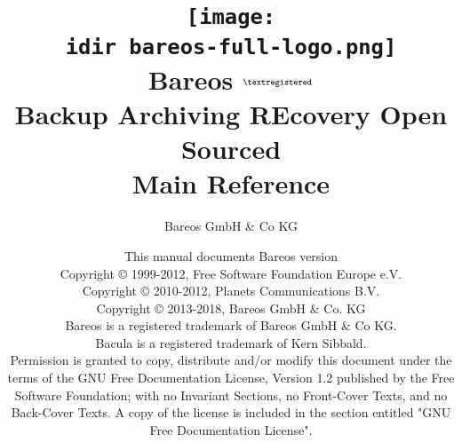 
\begin{titlepage}

\title{%
\texttt{[image: \\idir bareos-full-logo.png]} \\
\Huge{Bareos} $^{\normalsize \textregistered}$\\
\huge{Backup Archiving REcovery Open Sourced}\\[2ex]
Main Reference\\
}

\author{Bareos GmbH \& Co KG}
\date{This manual documents Bareos version \version \\
      \vspace{0.2in}
      Copyright {\copyright} 1999-2012, Free Software Foundation Europe e.V. \\
      Copyright {\copyright} 2010-2012, Planets Communications B.V. \\
      Copyright {\copyright} 2013-2018, Bareos GmbH \& Co. KG \\
      Bareos {\textregistered} is a registered trademark of Bareos GmbH \& Co KG.\\
      Bacula {\textregistered} is a registered trademark of Kern Sibbald.\\
      \vspace{0.2in}
  Permission is granted to copy, distribute and/or modify this document under the terms of the
  GNU Free Documentation License, Version 1.2 published by the Free Software Foundation;
  with no Invariant Sections, no Front-Cover Texts, and no Back-Cover Texts.
  A copy of the license is included in the section entitled "GNU Free Documentation License".
}

\maketitle

\end{titlepage}

